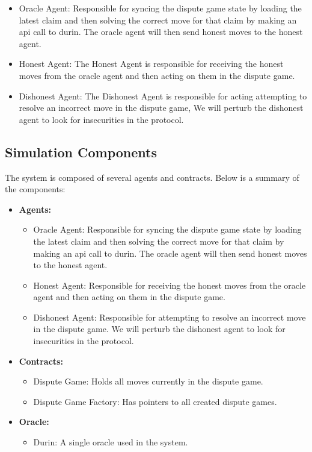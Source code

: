 \begin{itemize}
\tightlist
\item
  Oracle Agent: Responsible for syncing the dispute game state by
  loading the latest claim and then solving the correct move for that
  claim by making an api call to durin. The oracle agent will then send
  honest moves to the honest agent.
\item
  Honest Agent: The Honest Agent is responsible for receiving the honest
  moves from the oracle agent and then acting on them in the dispute
  game.
\item
  Dishonest Agent: The Dishonest Agent is responsible for acting
  attempting to resolve an incorrect move in the dispute game, We will
  perturb the dishonest agent to look for insecurities in the protocol.
\end{itemize}

\subsection{Simulation Components}\label{simulation-components}

The system is composed of several agents and contracts. Below is a summary of the components:

\begin{itemize}
\item \textbf{Agents:}
  \begin{itemize}
  \item Oracle Agent: Responsible for syncing the dispute game state by loading the latest claim and then solving the correct move for that claim by making an api call to durin. The oracle agent will then send honest moves to the honest agent.
  \item Honest Agent: Responsible for receiving the honest moves from the oracle agent and then acting on them in the dispute game.
  \item Dishonest Agent: Responsible for attempting to resolve an incorrect move in the dispute game. We will perturb the dishonest agent to look for insecurities in the protocol.
  \end{itemize}
\item \textbf{Contracts:}
  \begin{itemize}
  \item Dispute Game: Holds all moves currently in the dispute game.
  \item Dispute Game Factory: Has pointers to all created dispute games.
  \end{itemize}
\item \textbf{Oracle:}
  \begin{itemize}
  \item Durin: A single oracle used in the system.
  \end{itemize}
\end{itemize}

